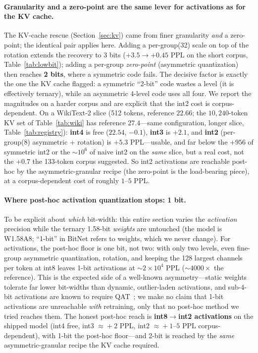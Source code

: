 \documentclass[11pt]{article}
\begin{document}
\paragraph{Granularity and a zero-point are the same lever for activations as for
the KV cache.} The KV-cache rescue (Section~\ref{sec:kv}) came from finer granularity
\emph{and} a zero-point; the identical pair applies here. Adding a per-group(32)
scale on top of the rotation extends the recovery to 3 bits ($+3.5\to\mathbf{+0.45}$
PPL on the short corpus, Table~\ref{tab:lowbit}); adding a per-group \emph{zero-point}
(asymmetric quantization) then reaches \textbf{2 bits}, where a symmetric code fails.
The decisive factor is exactly the one the KV cache flagged: a symmetric ``2-bit''
code wastes a level (it is effectively ternary), while an asymmetric 4-level code
uses all four. We report the magnitudes on a harder corpus and are explicit that the
int2 cost is corpus-dependent. On a WikiText-2 slice (512 tokens, reference $22.66$;
the $10{,}240$-token KV set of Table~\ref{tab:wiki} has reference $27.4$---same
configuration, longer slice, Table~\ref{tab:registry}): \textbf{int4} is free
($22.54$, $-0.1$), \textbf{int3} is $+2.1$, and \textbf{int2} (per-group(8)
asymmetric + rotation) is $\mathbf{+5.3}$ PPL---usable, and far below the
$+956$ of symmetric int2 or the $\sim\!10^6$ of naive int2 on the \emph{same} slice,
but a real cost, not the $+0.7$ the 133-token corpus suggested. So int2 activations
are reachable post-hoc by the asymmetric-granular recipe (the zero-point is the
load-bearing piece), at a corpus-dependent cost of roughly $1$--$5$ PPL.

\paragraph{Where post-hoc activation quantization stops: 1 bit.} To be explicit
about \emph{which} bit-width: this entire section varies the \emph{activation}
precision while the ternary 1.58-bit \emph{weights} are untouched (the model is
W1.58A8; ``1-bit'' in BitNet refers to weights, which we never change). For
activations, the post-hoc floor is one bit, not two: with only two levels, even
fine-group asymmetric quantization, rotation, and keeping the 128 largest channels
per token at int8 leaves 1-bit activations at $\sim\!2{\times}10^4$ PPL
($\sim\!4000\times$ the reference). This is the expected side of a well-known
asymmetry---static weights tolerate far lower bit-widths than dynamic, outlier-laden
activations, and sub-4-bit activations are known to require
QAT~\cite{wang2025bitnetv2}; we make no claim that 1-bit activations are unreachable
\emph{with} retraining, only that no post-hoc method we tried reaches them. The
honest post-hoc reach is \textbf{int8$\to$int2 activations} on the shipped model
(int4 free, int3 $\approx\!+2$ PPL, int2 $\approx\!+1$--$5$ PPL corpus-dependent),
with 1-bit the post-hoc floor---and 2-bit is reached by the \emph{same}
asymmetric-granular recipe the KV cache required.
\end{document}
